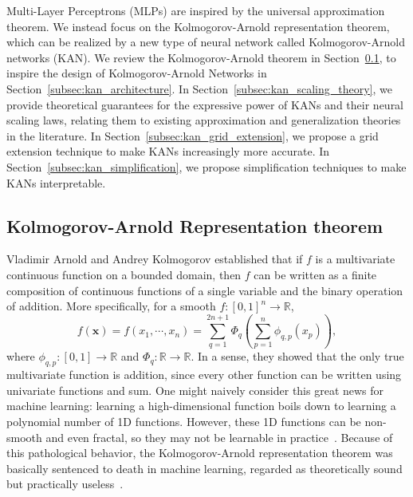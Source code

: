 \documentclass{article}
\numberwithin{equation}{section}
\numberwithin{figure}{section}
\newcommand{\mat}[1]{\mathbf{#1}}
\begin{document}
Multi-Layer Perceptrons (MLPs) are inspired by the universal approximation theorem. We instead focus on the Kolmogorov-Arnold representation theorem, which can be realized by a new type of neural network called Kolmogorov-Arnold networks (KAN). We review the Kolmogorov-Arnold theorem in Section~\ref{subsec:kart}, to inspire the design of Kolmogorov-Arnold Networks in Section~\ref{subsec:kan_architecture}. In Section~\ref{subsec:kan_scaling_theory}, we provide theoretical guarantees for the expressive power of KANs and their neural scaling laws, relating them to existing approximation and generalization theories in the literature. In Section~\ref{subsec:kan_grid_extension}, we propose a grid extension technique to make KANs increasingly more accurate. In Section~\ref{subsec:kan_simplification}, we propose simplification techniques to make KANs interpretable. 

\subsection{Kolmogorov-Arnold Representation theorem}\label{subsec:kart}

Vladimir Arnold and Andrey Kolmogorov established that if $f$ is a multivariate continuous function on a bounded domain, then $f$ can be written as a finite composition of continuous functions of a single variable and the binary operation of addition. More specifically, for a smooth $f:[0,1]^n\to\mathbb{R}$,
\begin{equation}\label{eq:KART}
    f(\mat{x}) = f(x_1,\cdots,x_n)=\sum_{q=1}^{2n+1} \Phi_q\left(\sum_{p=1}^n\phi_{q,p}(x_p)\right),
\end{equation}
where $\phi_{q,p}:[0,1]\to\mathbb{R}$ and $\Phi_q:\mathbb{R}\to\mathbb{R}$. In a sense, they showed that the only true multivariate function is addition, since every other function can be written using univariate functions and sum. One might naively consider this great news for machine learning: learning a high-dimensional function boils down to learning a polynomial number of 1D functions. However, these 1D functions can be non-smooth and even fractal, so they may not be learnable in practice~\cite{poggio2020theoretical,girosi1989representation}. Because of this pathological behavior, the Kolmogorov-Arnold representation theorem was basically sentenced to death in machine learning, regarded as theoretically sound but practically useless~\cite{poggio2020theoretical,girosi1989representation}. 
\end{document}

